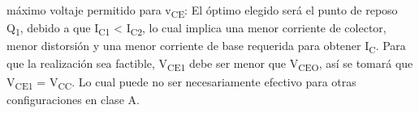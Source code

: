 \documentclass[12pt]{article}
\begin{document}
\vspace{\baselineskip}

\vspace{\baselineskip}

\vspace{\baselineskip}

\vspace{\baselineskip}
\begin{adjustwidth}{0.86in}{0.88in}
\begin{justify}
máximo voltaje permitido para v\textsubscript{CE}: El óptimo elegido será el punto de reposo Q\textsubscript{1}, debido a que I\textsubscript{C1} < I\textsubscript{C2}, lo cual implica una menor corriente de colector, menor distorsión y una menor corriente de base requerida para obtener I\textsubscript{C}. Para que la realización sea factible, V\textsubscript{CE1} debe ser menor que V\textsubscript{CEO}, así se tomará que V\textsubscript{CE1} = V\textsubscript{CC}. Lo cual puede no ser necesariamente efectivo para otras configuraciones en clase A.
\end{justify}\par

\end{adjustwidth}


\vspace{\baselineskip}


\end{document}
